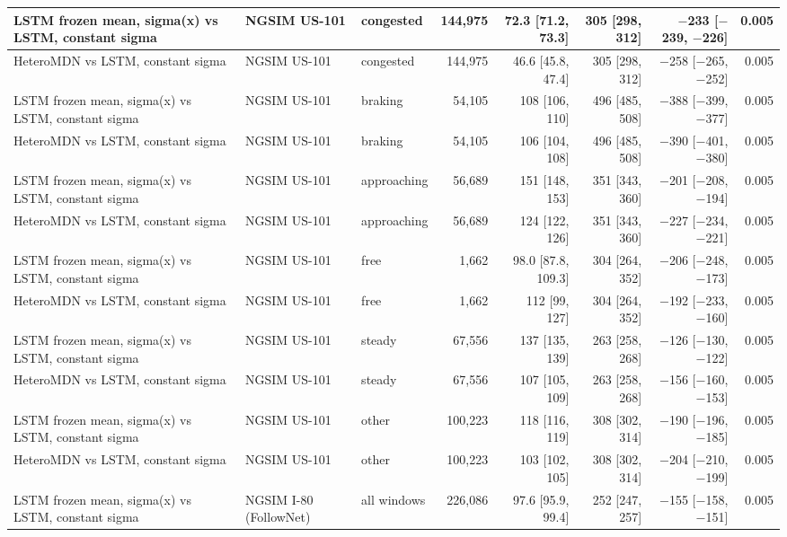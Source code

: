 \begin{longtable}{lllrrrrr}
\midrule
LSTM frozen mean, sigma(x) vs LSTM, constant sigma & NGSIM US-101 & congested & 144,975 & 72.3 [71.2, 73.3] & 305 [298, 312] & $-$233 [$-$239, $-$226] & 0.005 \\
\midrule
HeteroMDN vs LSTM, constant sigma & NGSIM US-101 & congested & 144,975 & 46.6 [45.8, 47.4] & 305 [298, 312] & $-$258 [$-$265, $-$252] & 0.005 \\
\midrule
LSTM frozen mean, sigma(x) vs LSTM, constant sigma & NGSIM US-101 & braking & 54,105 & 108 [106, 110] & 496 [485, 508] & $-$388 [$-$399, $-$377] & 0.005 \\
\midrule
HeteroMDN vs LSTM, constant sigma & NGSIM US-101 & braking & 54,105 & 106 [104, 108] & 496 [485, 508] & $-$390 [$-$401, $-$380] & 0.005 \\
\midrule
LSTM frozen mean, sigma(x) vs LSTM, constant sigma & NGSIM US-101 & approaching & 56,689 & 151 [148, 153] & 351 [343, 360] & $-$201 [$-$208, $-$194] & 0.005 \\
\midrule
HeteroMDN vs LSTM, constant sigma & NGSIM US-101 & approaching & 56,689 & 124 [122, 126] & 351 [343, 360] & $-$227 [$-$234, $-$221] & 0.005 \\
\midrule
LSTM frozen mean, sigma(x) vs LSTM, constant sigma & NGSIM US-101 & free & 1,662 & 98.0 [87.8, 109.3] & 304 [264, 352] & $-$206 [$-$248, $-$173] & 0.005 \\
\midrule
HeteroMDN vs LSTM, constant sigma & NGSIM US-101 & free & 1,662 & 112 [99, 127] & 304 [264, 352] & $-$192 [$-$233, $-$160] & 0.005 \\
\midrule
LSTM frozen mean, sigma(x) vs LSTM, constant sigma & NGSIM US-101 & steady & 67,556 & 137 [135, 139] & 263 [258, 268] & $-$126 [$-$130, $-$122] & 0.005 \\
\midrule
HeteroMDN vs LSTM, constant sigma & NGSIM US-101 & steady & 67,556 & 107 [105, 109] & 263 [258, 268] & $-$156 [$-$160, $-$153] & 0.005 \\
\midrule
LSTM frozen mean, sigma(x) vs LSTM, constant sigma & NGSIM US-101 & other & 100,223 & 118 [116, 119] & 308 [302, 314] & $-$190 [$-$196, $-$185] & 0.005 \\
\midrule
HeteroMDN vs LSTM, constant sigma & NGSIM US-101 & other & 100,223 & 103 [102, 105] & 308 [302, 314] & $-$204 [$-$210, $-$199] & 0.005 \\
\midrule
LSTM frozen mean, sigma(x) vs LSTM, constant sigma & NGSIM I-80 (FollowNet) & all windows & 226,086 & 97.6 [95.9, 99.4] & 252 [247, 257] & $-$155 [$-$158, $-$151] & 0.005 \\
\midrule

\end{longtable}
